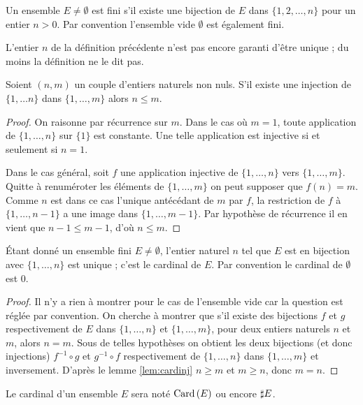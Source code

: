 \documentclass[12pt, a4paper]{article}
\begin{document}
\begin{defn}
  Un ensemble $E \neq \emptyset$ est fini s'il existe une bijection de
  $E$ dans $\{1, 2, \ldots, n\}$ pour un entier $n > 0$. Par
  convention l'ensemble vide $\emptyset$ est également fini.
\end{defn}
\noindent L'entier $n$ de la définition précédente n'est pas encore
garanti d'être unique ; du moins la définition ne le dit pas.
\begin{lem}
  \label{lem:cardinj}
  Soient $(n, m)$ un couple d'entiers naturels non nuls. S'il existe
  une injection de $\{1, \ldots n\}$ dans $\{1, \ldots, m\}$ alors
  $n \leq m$.
\end{lem}
\begin{proof}
  On raisonne par récurrence sur $m$. Dans le cas où $m = 1$, toute
  application de $\{1, \ldots, n\}$ sur $\{1\}$ est constante. Une
  telle application est injective si et seulement si $n = 1$.

  Dans le cas général, soit $f$ une application injective de
  $\{1, \ldots, n\}$ vers $\{1, \ldots, m\}$. Quitte à renuméroter les
  éléments de $\{1, \ldots, m\}$ on peut supposer que $f(n) =
  m$. Comme $n$ est dans ce cas l'unique antécédant de $m$ par $f$, la
  restriction de $f$ à $\{1, \ldots, n-1\}$ a une image dans
  $\{1, \ldots, m-1\}$. Par hypothèse de récurrence il en vient que
  $n-1 \leq m-1$, d'où $n \leq m$.
\end{proof}
\begin{cor}
  \label{c:bonnedefcard}
  Étant donné un ensemble fini $E \neq \emptyset$, l'entier naturel
  $n$ tel que $E$ est en bijection avec $\{1, \ldots, n\}$ est unique
  ; c'est le cardinal de $E$. Par convention le cardinal de
  $\emptyset$ est $0$.
\end{cor}
\begin{proof}
  Il n'y a rien à montrer pour le cas de l'ensemble vide car la
  question est réglée par convention. On cherche à montrer que s'il
  existe des bijections $f$ et $g$ respectivement de $E$ dans
  $\{1, \ldots, n\}$ et $\{1, \ldots, m\}$, pour deux entiers naturels
  $n$ et $m$, alors $n = m$. Sous de telles hypothèses on obtient les
  deux bijections (et donc injections) $f^{-1}\circ g$ et
  $g^{-1}\circ f$ respectivement de $\{1, \ldots, n\}$ dans
  $\{1, \ldots, m\}$ et inversement. D'après le lemme \ref{lem:cardinj}
  $n \geq m$ et $m \geq n$, donc $m = n$.
\end{proof}

\begin{nota}
  Le cardinal d'un ensemble $E$ sera noté $\mathrm{Card}\left(E\right)$ ou encore
  $\sharp E$.
\end{nota}
\end{document}
